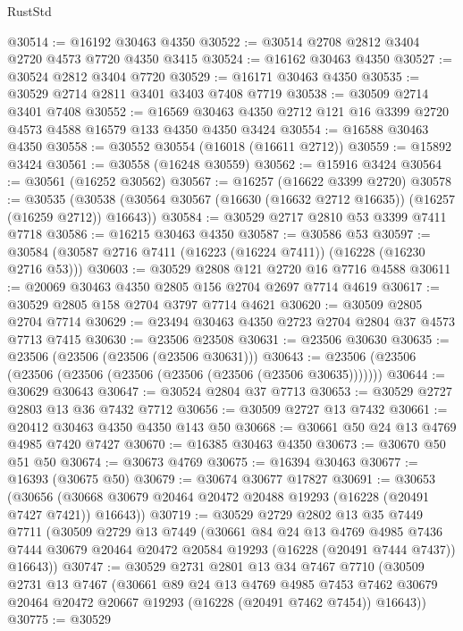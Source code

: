 \begin{lexlean}{RustStd}
\begin{coremodule}
@30514 := @16192 @30463 @4350
@30522 := @30514 @2708 @2812 @3404 @2720 @4573 @7720 @4350 @3415
@30524 := @16162 @30463 @4350
@30527 := @30524 @2812 @3404 @7720
@30529 := @16171 @30463 @4350
@30535 := @30529 @2714 @2811 @3401 @3403 @7408 @7719
@30538 := @30509 @2714 @3401 @7408
@30552 := @16569 @30463 @4350 @2712 @121 @16 @3399 @2720 @4573 @4588 @16579 @133 @4350 @4350 @3424
@30554 := @16588 @30463 @4350
@30558 := @30552 @30554 (@16018 (@16611 @2712))
@30559 := @15892 @3424
@30561 := @30558 (@16248 @30559)
@30562 := @15916 @3424
@30564 := @30561 (@16252 @30562)
@30567 := @16257 (@16622 @3399 @2720)
@30578 := @30535
    (@30538 (@30564 @30567 (@16630 (@16632 @2712 @16635)) (@16257 (@16259 @2712)) @16643))
@30584 := @30529 @2717 @2810 @53 @3399 @7411 @7718
@30586 := @16215 @30463 @4350
@30587 := @30586 @53
@30597 := @30584 (@30587 @2716 @7411 (@16223 (@16224 @7411)) (@16228 (@16230 @2716 @53)))
@30603 := @30529 @2808 @121 @2720 @16 @7716 @4588
@30611 := @20069 @30463 @4350 @2805 @156 @2704 @2697 @7714 @4619
@30617 := @30529 @2805 @158 @2704 @3797 @7714 @4621
@30620 := @30509 @2805 @2704 @7714
@30629 := @23494 @30463 @4350 @2723 @2704 @2804 @37 @4573 @7713 @7415
@30630 := @23506 @23508
@30631 := @23506 @30630
@30635 := @23506 (@23506 (@23506 (@23506 @30631)))
@30643 := @23506 (@23506 (@23506 (@23506 (@23506 (@23506 (@23506 (@23506 @30635)))))))
@30644 := @30629 @30643
@30647 := @30524 @2804 @37 @7713
@30653 := @30529 @2727 @2803 @13 @36 @7432 @7712
@30656 := @30509 @2727 @13 @7432
@30661 := @20412 @30463 @4350 @4350 @143 @50
@30668 := @30661 @50 @24 @13 @4769 @4985 @7420 @7427
@30670 := @16385 @30463 @4350
@30673 := @30670 @50 @51 @50
@30674 := @30673 @4769
@30675 := @16394 @30463
@30677 := @16393 (@30675 @50)
@30679 := @30674 @30677 @17827
@30691 := @30653
    (@30656 (@30668 @30679 @20464 @20472 @20488 @19293 (@16228 (@20491 @7427 @7421)) @16643))
@30719 := @30529
    @2729
    @2802
    @13
    @35
    @7449
    @7711
    (@30509
      @2729
      @13
      @7449
      (@30661
        @84
        @24
        @13
        @4769
        @4985
        @7436
        @7444
        @30679
        @20464
        @20472
        @20584
        @19293
        (@16228 (@20491 @7444 @7437))
        @16643))
@30747 := @30529
    @2731
    @2801
    @13
    @34
    @7467
    @7710
    (@30509
      @2731
      @13
      @7467
      (@30661
        @89
        @24
        @13
        @4769
        @4985
        @7453
        @7462
        @30679
        @20464
        @20472
        @20667
        @19293
        (@16228 (@20491 @7462 @7454))
        @16643))
@30775 := @30529

\end{coremodule}
\end{lexlean}
